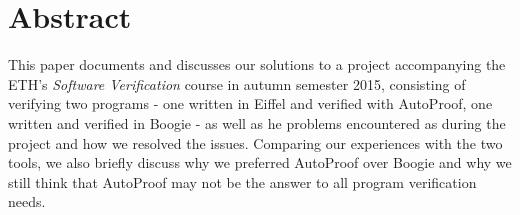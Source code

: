 \section*{Abstract}
This paper documents and discusses our solutions to a project accompanying the ETH's \emph{Software Verification} course in autumn semester 2015, consisting of verifying two programs - one written in Eiffel and verified with AutoProof, one written and verified in Boogie - as well as he problems encountered as during the project and how we resolved the issues. Comparing our experiences with the two tools, we also briefly discuss why we preferred AutoProof over Boogie and why we still think that AutoProof may not be the answer to all program verification needs.\\ 